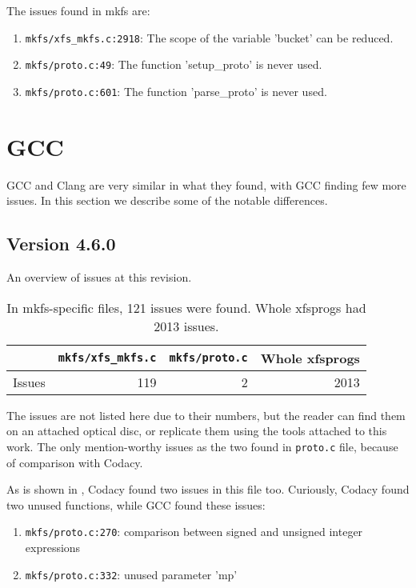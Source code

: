The issues found in mkfs are:
\begin{enumerate}
	\item {\tt mkfs/xfs\_mkfs.c:2918}: The scope of the variable
		'bucket' can be reduced.
	\item {\tt mkfs/proto.c:49}: The function 'setup\_proto' is never
		used.
	\item {\tt mkfs/proto.c:601}: The function 'parse\_proto' is never
		used.
\end{enumerate}

\section{GCC}\label{chap:results:gcc}
GCC and Clang are very similar in what they found, with GCC finding few
more issues. In this section we describe some of the notable differences.

\subsection{Version 4.6.0}\label{chap:results:gcc:4.6}

An overview of issues at this revision.
\begin{table}[h]
\begin{tabular}{|l||r|r||r|}
\hline
& {\tt mkfs/xfs\_mkfs.c} & {\tt mkfs/proto.c} & Whole xfsprogs \\
\hline
Issues & 119 & 2 & 2013 \\
\hline
\end{tabular}
\caption{In mkfs-specific files, 121 issues were found. Whole
xfsprogs had 2013 issues.}
\end{table}

The issues are not listed here due to their numbers, but the reader can
find them on an attached optical disc, or replicate them using the tools
attached to this work. The only mention-worthy issues as the two found in
{\tt proto.c} file, because of comparison with Codacy.

As is shown in , Codacy found two issues in
this file too. Curiously, Codacy found two unused functions, while GCC
found these issues:
\begin{enumerate}
	\item {\tt mkfs/proto.c:270}: comparison between signed and unsigned integer expressions
	\item {\tt mkfs/proto.c:332}: unused parameter 'mp'
\end{enumerate}

